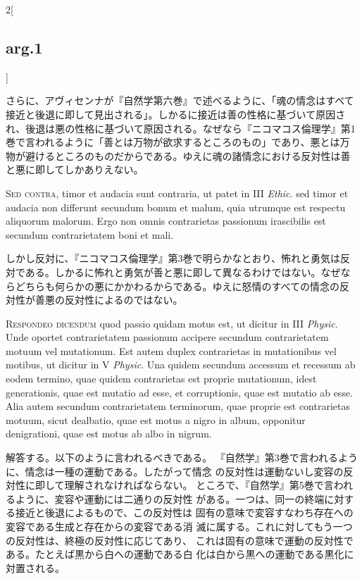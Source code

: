 \documentclass[paper=a4paper,fontsize=10pt,jafontsize=9pt,titlepage]{jlreq}
\begin{document}
\begin{paracol}{2}[\subsection{arg.1}]
\switchcolumn

さらに、アヴィセンナが『自然学第六巻』で述べるように、「魂の情念はすべて
 接近と後退に即して見出される」。しかるに接近は善の性格に基づいて原因さ
 れ、後退は悪の性格に基づいて原因される。なぜなら『ニコマコス倫理学』第1
 巻で言われるように「善とは万物が欲求するところのもの」であり、悪とは万
 物が避けるところのものだからである。ゆえに魂の諸情念における反対性は善
 と悪に即してしかありえない。

\switchcolumn*[\subsection{s.c.}]

{\scshape Sed contra}, timor et audacia sunt contraria, ut patet in III {\itshape Ethic}. sed
timor et audacia non differunt secundum bonum et malum, quia utrumque
est respectu aliquorum malorum. Ergo non omnis contrarietas passionum
irascibilis est secundum contrarietatem boni et mali.

\switchcolumn

しかし反対に、『ニコマコス倫理学』第3巻で明らかなとおり、怖れと勇気は反
 対である。しかるに怖れと勇気が善と悪に即して異なるわけではない。なぜな
 らどちらも何らかの悪にかかわるからである。ゆえに怒情のすべての情念の反
 対性が善悪の反対性によるのではない。


{\scshape Respondeo dicendum} quod passio quidam motus est, ut dicitur in III
{\itshape Physic}. Unde oportet contrarietatem passionum accipere secundum
contrarietatem motuum vel mutationum. Est autem duplex contrarietas in
mutationibus vel motibus, ut dicitur in V {\itshape Physic}. Una quidem secundum
accessum et recessum ab eodem termino, quae quidem contrarietas est
proprie mutationum, idest generationis, quae est mutatio ad esse, et
corruptionis, quae est mutatio ab esse. Alia autem secundum
contrarietatem terminorum, quae proprie est contrarietas motuum, sicut
dealbatio, quae est motus a nigro in album, opponitur denigrationi, quae
est motus ab albo in nigrum.

\switchcolumn

解答する。以下のように言われるべきである。
『自然学』第3巻で言われるように、情念は一種の運動である。したがって情念
 の反対性は運動ないし変容の反対性に即して理解されなければならない。
ところで、『自然学』第5巻で言われるように、変容や運動には二通りの反対性
 がある。一つは、同一の終端に対する接近と後退によるもので、この反対性は
 固有の意味で変容すなわち存在への変容である生成と存在からの変容である消
 滅に属する。これに対してもう一つの反対性は、終極の反対性に応じてあり、
 これは固有の意味で運動の反対性である。たとえば黒から白への運動である白
 化は白から黒への運動である黒化に対置される。


\end{paracol}
\end{document}

